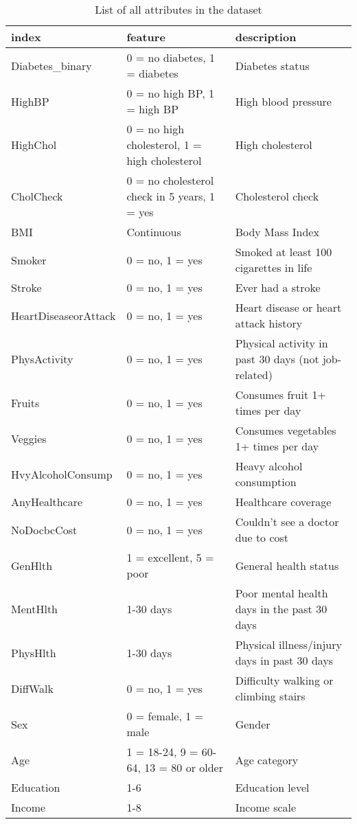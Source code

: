 \begin{table}[ht]
\centering
\begin{tabular}{|l|l|l|}
\hline
index & feature & description \\
\hline
Diabetes\_binary & 0 = no diabetes, 1 = diabetes & Diabetes status \\
\hline
HighBP & 0 = no high BP, 1 = high BP & High blood pressure \\
\hline
HighChol & 0 = no high cholesterol, 1 = high cholesterol & High cholesterol \\
\hline
CholCheck & 0 = no cholesterol check in 5 years, 1 = yes & Cholesterol check \\
\hline
BMI & Continuous & Body Mass Index \\
\hline
Smoker & 0 = no, 1 = yes & Smoked at least 100 cigarettes in life \\
\hline
Stroke & 0 = no, 1 = yes & Ever had a stroke \\
\hline
HeartDiseaseorAttack & 0 = no, 1 = yes & Heart disease or heart attack history \\
\hline
PhysActivity & 0 = no, 1 = yes & Physical activity in past 30 days (not job-related) \\
\hline
Fruits & 0 = no, 1 = yes & Consumes fruit 1+ times per day \\
\hline
Veggies & 0 = no, 1 = yes & Consumes vegetables 1+ times per day \\
\hline
HvyAlcoholConsump & 0 = no, 1 = yes & Heavy alcohol consumption \\
\hline
AnyHealthcare & 0 = no, 1 = yes & Healthcare coverage \\
\hline
NoDocbcCost & 0 = no, 1 = yes & Couldn’t see a doctor due to cost \\
\hline
GenHlth & 1 = excellent, 5 = poor & General health status \\
\hline
MentHlth & 1-30 days & Poor mental health days in the past 30 days \\
\hline
PhysHlth & 1-30 days & Physical illness/injury days in past 30 days \\
\hline
DiffWalk & 0 = no, 1 = yes & Difficulty walking or climbing stairs \\
\hline
Sex & 0 = female, 1 = male & Gender \\
\hline
Age & 1 = 18-24, 9 = 60-64, 13 = 80 or older & Age category \\
\hline
Education & 1-6 & Education level \\
\hline
Income & 1-8 & Income scale \\
\hline
\end{tabular}
\caption{List of all attributes in the dataset}
\end{table}


